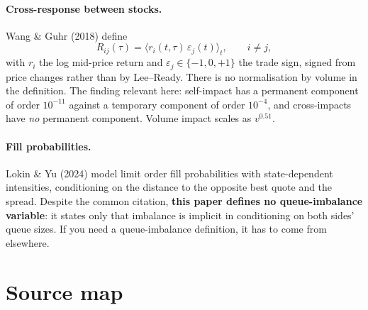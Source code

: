 \documentclass[11pt]{article}
\begin{document}
\paragraph{Cross-response between stocks.} Wang \& Guhr (2018) define
\begin{equation}
R_{ij}(\tau)=\bigl\langle r_i(t,\tau)\,\varepsilon_j(t)\bigr\rangle_t,\qquad i\neq j,
\end{equation}
with $r_i$ the log mid-price return and $\varepsilon_j\in\{-1,0,+1\}$ the trade
sign, signed from price changes rather than by Lee--Ready. There is no
normalisation by volume in the definition. The finding relevant here: self-impact
has a permanent component of order $10^{-11}$ against a temporary component of
order $10^{-4}$, and cross-impacts have \emph{no} permanent component. Volume
impact scales as $v^{0.51}$.

\paragraph{Fill probabilities.} Lokin \& Yu (2024) model limit order fill
probabilities with state-dependent intensities, conditioning on the distance to
the opposite best quote and the spread. Despite the common citation,
\textbf{this paper defines no queue-imbalance variable}: it states only that
imbalance is implicit in conditioning on both sides' queue sizes. If you need a
queue-imbalance definition, it has to come from elsewhere.

\section{Source map}\label{sec:map}
\end{document}
